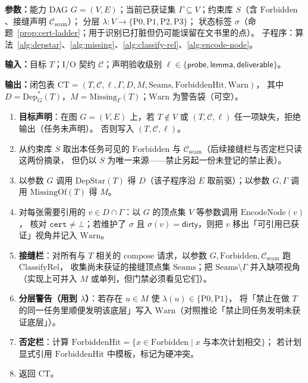 \documentclass[UTF8,a4paper,11pt]{ctexart}
\theoremstyle{definition}
\theoremstyle{plain}
\theoremstyle{remark}
\numberwithin{figure}{section}
\numberwithin{table}{section}
\newcounter{methodalg}[section]
\renewcommand{\themethodalg}{\thesection.\arabic{methodalg}}
\newenvironment{methodalgo}[1]{%
  \refstepcounter{methodalg}%
  \begin{tcolorbox}[
    enhanced, breakable,
    colback=blue!2, colframe=blue!35, coltext=black,
    boxrule=0.5pt, arc=2pt,
    left=6pt, right=6pt, top=4pt, bottom=4pt,
    title={算法~\themethodalg：#1},
    fonttitle=\bfseries\color{black},
    coltitle=black,
    attach boxed title to top left={yshift=-2mm,xshift=4mm},
    boxed title style={colback=white, colframe=blue!35, boxrule=0.4pt, coltitle=black}
  ]
  \small\color{black}
}{%
  \end{tcolorbox}
}
\newcommand{\algoparam}[1]{\par\noindent\textbf{参数：}#1\par\vspace{2pt}}
\newcommand{\algoin}[1]{\noindent\textbf{输入：}#1\par}
\newcommand{\algoout}[1]{\noindent\textbf{输出：}#1\par\vspace{4pt}}
\newenvironment{algosteps}{%
  \begin{enumerate}[leftmargin=2.2em, label=\textbf{\arabic*:}, itemsep=2pt, topsep=2pt]
}{%
  \end{enumerate}
}
\begin{document}
\begin{methodalgo}{填写闭包表 $\mathrm{BuildClosureTable}$}
\label{alg:closure-table}
\algoparam{能力 DAG $G=(V,E)$；当前已获证集 $\Gamma\subseteq V$；约束库 $S$（含 $\mathrm{Forbidden}$、接缝声明 $\mathcal{C}_{\mathrm{seam}}$）；
分层 $\lambda:V\to\{\mathrm{P0},\mathrm{P1},\mathrm{P2},\mathrm{P3}\}$；
状态标签 $\sigma$（命题~\ref{prop:cert-ladder}；用于识别已打脏但仍可能误留在文书里的点）。
子程序：算法~\ref{alg:depstar}、\ref{alg:missing}、\ref{alg:classify-rel}、\ref{alg:encode-node}。}
\algoin{目标 $T$；I/O 契约 $\mathcal{C}$；声明验收级别 $\ell\in\{\mathsf{probe},\mathsf{lemma},\mathsf{deliverable}\}$。}
\algoout{闭包表
$\mathrm{CT}=(T,\mathcal{C},\ell,\Gamma,D,M,\mathrm{Seams},\mathrm{ForbiddenHit},\mathrm{Warn})$，
其中 $D=\mathrm{Dep}^*_G(T)$，$M=\mathrm{Missing}_\Gamma(T)$；$\mathrm{Warn}$ 为警告袋（可空）。}
\begin{algosteps}
  \item \textbf{目标声明}：在图 $G=(V,E)$ 上，若 $T\notin V$ 或 $(T,\mathcal{C},\ell)$ 任一项缺失，拒绝输出（任务未声明）。
        否则写入 $(T,\mathcal{C},\ell)$。
  \item 从约束库 $S$ 取出本任务可见的 $\mathrm{Forbidden}$ 与 $\mathcal{C}_{\mathrm{seam}}$（后续接缝栏与否定栏只读这两份摘录，
        但仍以 $S$ 为唯一来源——禁止另起一份未登记的禁止表）。
  \item 以参数 $G$ 调用 $\mathrm{DepStar}(T)$ 得 $D$（该子程序沿 $E$ 取前驱）；以参数 $G,\Gamma$ 调用 $\mathrm{MissingOf}(T)$ 得 $M$。
  \item 对每张需要引用的 $v\in D\cap\Gamma$：以 $G$ 的顶点集 $V$ 等参数调用 $\mathrm{EncodeNode}(v)$，
        核对 $\texttt{cert}\neq\bot$；若维护了 $\sigma$ 且 $\sigma(v)=\mathsf{dirty}$，则把 $v$ 移出「可引用已获证」视角并记入 $\mathrm{Warn}$。
  \item \textbf{接缝栏}：对所有与 $T$ 相关的 $\mathrm{compose}$ 请求，以参数 $G,\mathrm{Forbidden},\mathcal{C}_{\mathrm{seam}}$ 跑 $\mathrm{ClassifyRel}$，
        收集尚未获证的接缝顶点集 $\mathrm{Seams}$；把 $\mathrm{Seams}\setminus\Gamma$ 并入缺项视角
        （实现上可并入 $M$ 或单列，但门禁必须看见它们）。
  \item \textbf{分层警告（用到 $\lambda$）}：若存在 $u\in M$ 使 $\lambda(u)\in\{\mathrm{P0},\mathrm{P1}\}$，
        将「禁止在做 $T$ 的同一任务里顺便发明该底层」写入 $\mathrm{Warn}$（对照推论「禁止同任务发明未获证底层」）。
  \item \textbf{否定栏}：计算 $\mathrm{ForbiddenHit}=\{x\in\mathrm{Forbidden}\mid x\text{ 与本次计划相交}\}$；
        若计划显式引用 $\mathrm{ForbiddenHit}$ 中模板，标记为硬冲突。
  \item 返回 $\mathrm{CT}$。
\end{algosteps}
\end{methodalgo}
\end{document}
